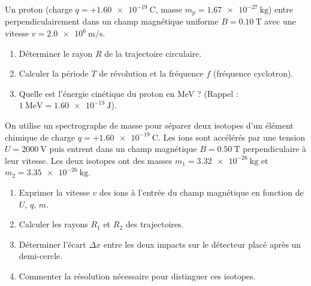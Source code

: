 \documentclass[11pt]{article}
\begin{document}
\begin{exercice}
Un proton (charge $q = +\SI{1,60e-19}{\coulomb}$, masse $m_p = \SI{1,67e-27}{\kilogram}$) entre perpendiculairement dans un champ magnétique uniforme $B = \SI{0,10}{\tesla}$ avec une vitesse $v = \SI{2,0e6}{\meter\per\second}$.
\begin{enumerate}
    \item Déterminer le rayon $R$ de la trajectoire circulaire.
    \item Calculer la période $T$ de révolution et la fréquence $f$ (fréquence cyclotron).
    \item Quelle est l'énergie cinétique du proton en MeV ? (Rappel : $\SI{1}{\MeV} = \SI{1,60e-13}{\joule}$).
\end{enumerate}
\end{exercice}

\begin{exercice}
On utilise un spectrographe de masse pour séparer deux isotopes d'un élément chimique de charge $q = +\SI{1,60e-19}{\coulomb}$. Les ions sont accélérés par une tension $U = \SI{2000}{\volt}$ puis entrent dans un champ magnétique $B = \SI{0,50}{\tesla}$ perpendiculaire à leur vitesse. Les deux isotopes ont des masses $m_1 = \SI{3,32e-26}{\kilogram}$ et $m_2 = \SI{3,35e-26}{\kilogram}$.
\begin{enumerate}
    \item Exprimer la vitesse $v$ des ions à l'entrée du champ magnétique en fonction de $U$, $q$, $m$.
    \item Calculer les rayons $R_1$ et $R_2$ des trajectoires.
    \item Déterminer l'écart $\Delta x$ entre les deux impacts sur le détecteur placé après un demi-cercle.
    \item Commenter la résolution nécessaire pour distinguer ces isotopes.
\end{enumerate}
\end{exercice}
\end{document}
